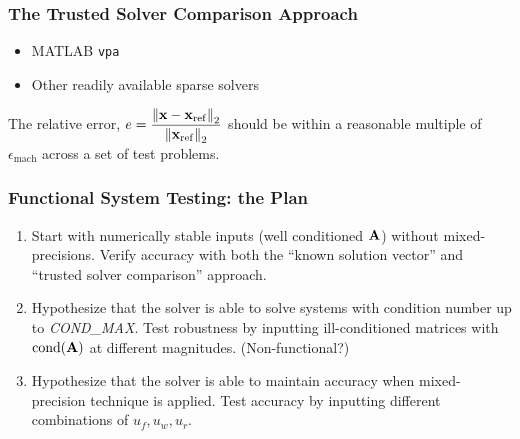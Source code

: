 \documentclass[t,12pt,numbers,fleqn]{beamer}
\begin{document}

\begin{frame}
\frametitle{The Trusted Solver Comparison Approach}

\begin{itemize}
\item MATLAB\textsuperscript{\textregistered{}} \texttt{vpa}
\item Other readily available sparse solvers
\end{itemize}

The relative error, \(e = \displaystyle \frac{\left\lVert\mathbf{x} -
    \mathbf{x}_\mathrm{ref}\right\rVert_2}{\left\lVert\mathbf{x}_\mathrm{ref}\right\rVert_2}\) should be within a
reasonable multiple of \(\epsilon_\mathrm{mach}\) across a set of test problems.

\end{frame}


\begin{frame}
\frametitle{Functional System Testing: the Plan}

\begin{enumerate}
\item Start with numerically stable inputs (well conditioned \(\mathbf{A}\)) without
  mixed-precisions. Verify accuracy with both the ``known solution vector'' and
  ``trusted solver comparison'' approach.
\item Hypothesize that the solver is able to solve systems with condition number up
  to \textit{COND\_MAX}. Test robustness by inputting ill-conditioned matrices
  with \(\mathrm{cond}(\mathbf{A})\) at different magnitudes. (Non-functional?)
\item Hypothesize that the solver is able to maintain accuracy when mixed-precision
  technique is applied. Test accuracy by inputting different combinations of
  \(u_f, u_w, u_r\).
\end{enumerate}

\end{frame}

\end{document}
